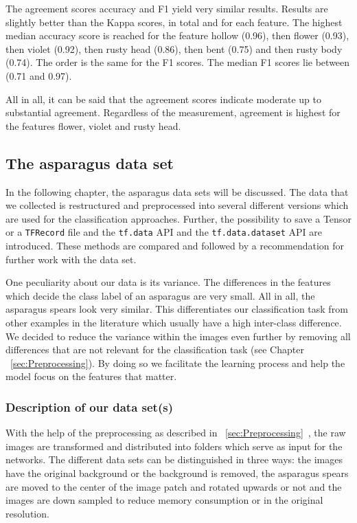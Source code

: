 The agreement scores accuracy and F1 yield very similar results. Results are slightly better than the Kappa scores, in total and for each feature. The highest median accuracy score is reached for the feature hollow (0.96), then flower (0.93), then violet (0.92), then rusty head (0.86), then bent (0.75) and then rusty body (0.74). The order is the same for the F1 scores. The median F1 scores lie between (0.71 and 0.97).

\bigskip
All in all, it can be said that the agreement scores indicate moderate up to substantial agreement. Regardless of the measurement, agreement is highest for the features flower, violet and rusty head.


\subsection{The asparagus data set}
\label{sec:AsparagusDataSet}

In the following chapter, the asparagus data sets will be discussed. The data that we collected is restructured and preprocessed into several different versions which are used for the classification approaches. Further, the possibility to save a Tensor or a \texttt{TFRecord} file and the \mbox{\texttt{tf.data}} API and the \mbox{\texttt{tf.data.dataset}} API are introduced. These methods are compared and followed by a recommendation for further work with the data set.

One peculiarity about our data is its variance. The differences in the features which decide the class label of an asparagus are very small. All in all, the asparagus spears look very similar. This differentiates our classification task from other examples in the literature which usually have a high inter-class difference. We decided to reduce the variance within the images even further by removing all differences that are not relevant for the classification task (see Chapter ~\ref{sec:Preprocessing}). By doing so we facilitate the learning process and help the model focus on the features that matter.

\subsubsection{Description of our data set(s)}
\label{subsec:DifferentDataSets}


With the help of the preprocessing as described in ~\ref{sec:Preprocessing}~, the raw images are transformed and distributed into folders which serve as input for the networks.
The different data sets can be distinguished in three ways: the images have the original background or the background is removed, the asparagus spears are moved to the center of the image patch and rotated upwards or not and the images are down sampled to reduce memory consumption or in the original resolution.

